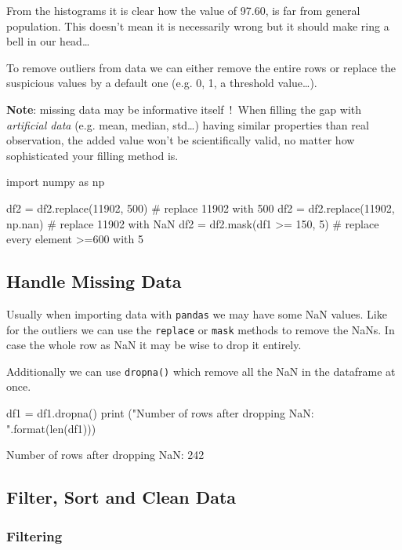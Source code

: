From the histograms it is clear how the value of 97.60, is far from general population. This doesn't mean it is necessarily wrong but it should make ring a bell in our head\ldots

To remove outliers from data we can either remove the entire rows or replace the suspicious values by a default one 
(e.g. 0, 1, a threshold value\ldots).

\textbf{Note}: missing data may be informative itself~!~When filling the gap with \emph{artificial data} (e.g. mean, median, std\ldots) having similar properties than real observation, the added value won't be scientifically valid, no matter how sophisticated your filling method is.

\begin{ipython}
import numpy as np

df2 = df2.replace(11902, 500) # replace 11902 with 500
df2 = df2.replace(11902, np.nan) # replace 11902 with NaN
df2 = df2.mask(df1 >= 150, 5) # replace every element >=600 with 5
\end{ipython}

\subsection{Handle Missing Data}\label{handle-missing-data}

Usually when importing data with \texttt{pandas} we may have some NaN values. Like for the outliers we can use the \texttt{replace} or \texttt{mask} methods to remove the NaNs. In case the whole row as NaN it may be wise to drop it entirely.

Additionally we can use \texttt{dropna()} which remove all the NaN in the dataframe at once.

\begin{ipython}
df1 = df1.dropna()
print ("Number of rows after dropping NaN: {}".format(len(df1)))
\end{ipython}
\begin{ioutput}
Number of rows after dropping NaN: 242
\end{ioutput}

\subsection{Filter, Sort and Clean Data}
\label{filter-sort-and-clean-data}

\subsubsection{Filtering}\label{filtering}

